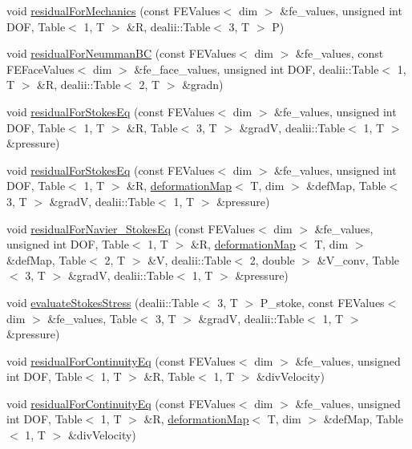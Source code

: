 \begin{DoxyCompactItemize}
void \mbox{\hyperlink{class_residual_a432fe02216f182fd241f09775131f854}{residual\+For\+Mechanics}} (const F\+E\+Values$<$ dim $>$ \&fe\+\_\+values, unsigned int D\+OF, Table$<$ 1, T $>$ \&R, dealii\+::\+Table$<$ 3, T $>$ P)
\item 
void \mbox{\hyperlink{class_residual_a4c8fd158c8034b25780abfe785755baa}{residual\+For\+Neumman\+BC}} (const F\+E\+Values$<$ dim $>$ \&fe\+\_\+values, const F\+E\+Face\+Values$<$ dim $>$ \&fe\+\_\+face\+\_\+values, unsigned int D\+OF, dealii\+::\+Table$<$ 1, T $>$ \&R, dealii\+::\+Table$<$ 2, T $>$ \&gradn)
\item 
void \mbox{\hyperlink{class_residual_a9a8f493fb66e0bd394948af13a27d821}{residual\+For\+Stokes\+Eq}} (const F\+E\+Values$<$ dim $>$ \&fe\+\_\+values, unsigned int D\+OF, Table$<$ 1, T $>$ \&R, Table$<$ 3, T $>$ \&gradV, dealii\+::\+Table$<$ 1, T $>$ \&pressure)
\item 
void \mbox{\hyperlink{class_residual_a95ad863ab9066d2dbfef9db3907a911f}{residual\+For\+Stokes\+Eq}} (const F\+E\+Values$<$ dim $>$ \&fe\+\_\+values, unsigned int D\+OF, Table$<$ 1, T $>$ \&R, \mbox{\hyperlink{structdeformation_map}{deformation\+Map}}$<$ T, dim $>$ \&def\+Map, Table$<$ 3, T $>$ \&gradV, dealii\+::\+Table$<$ 1, T $>$ \&pressure)
\item 
void \mbox{\hyperlink{class_residual_a34f1f680e957e21ac47c35f404e9fd6a}{residual\+For\+Navier\+\_\+\+Stokes\+Eq}} (const F\+E\+Values$<$ dim $>$ \&fe\+\_\+values, unsigned int D\+OF, Table$<$ 1, T $>$ \&R, \mbox{\hyperlink{structdeformation_map}{deformation\+Map}}$<$ T, dim $>$ \&def\+Map, Table$<$ 2, T $>$ \&V, dealii\+::\+Table$<$ 2, double $>$ \&V\+\_\+conv, Table$<$ 3, T $>$ \&gradV, dealii\+::\+Table$<$ 1, T $>$ \&pressure)
\item 
void \mbox{\hyperlink{class_residual_a7e33928364e99df9a42db58752aca7f3}{evaluate\+Stokes\+Stress}} (dealii\+::\+Table$<$ 3, T $>$ P\+\_\+stoke, const F\+E\+Values$<$ dim $>$ \&fe\+\_\+values, Table$<$ 3, T $>$ \&gradV, dealii\+::\+Table$<$ 1, T $>$ \&pressure)
\item 
void \mbox{\hyperlink{class_residual_a882f4595a6547599cfe8f65897f45896}{residual\+For\+Continuity\+Eq}} (const F\+E\+Values$<$ dim $>$ \&fe\+\_\+values, unsigned int D\+OF, Table$<$ 1, T $>$ \&R, Table$<$ 1, T $>$ \&div\+Velocity)
\item 
void \mbox{\hyperlink{class_residual_afddbdda003424f242266894fdd1f7b1a}{residual\+For\+Continuity\+Eq}} (const F\+E\+Values$<$ dim $>$ \&fe\+\_\+values, unsigned int D\+OF, Table$<$ 1, T $>$ \&R, \mbox{\hyperlink{structdeformation_map}{deformation\+Map}}$<$ T, dim $>$ \&def\+Map, Table$<$ 1, T $>$ \&div\+Velocity)

\end{DoxyCompactItemize}
